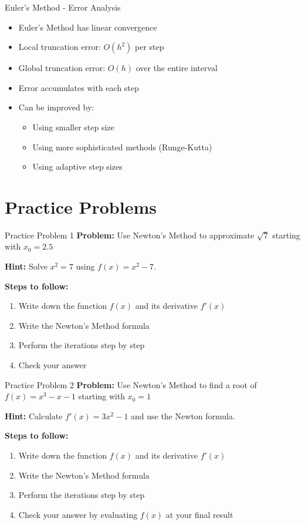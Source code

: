 \documentclass[aspectratio=169]{beamer}
\begin{document}
\begin{frame}{Euler's Method - Error Analysis}
\begin{itemize}
    \item Euler's Method has linear convergence
    \item Local truncation error: $O(h^2)$ per step
    \item Global truncation error: $O(h)$ over the entire interval
    \item Error accumulates with each step
    \item Can be improved by:
    \begin{itemize}
        \item Using smaller step size
        \item Using more sophisticated methods (Runge-Kutta)
        \item Using adaptive step sizes
    \end{itemize}
\end{itemize}
\end{frame}

\section{Practice Problems}

\begin{frame}{Practice Problem 1}
\textbf{Problem:} Use Newton's Method to approximate $\sqrt{7}$ starting with $x_0 = 2.5$

\textbf{Hint:} Solve $x^2 = 7$ using $f(x) = x^2 - 7$.

\vspace{1cm}
\textbf{Steps to follow:}
\begin{enumerate}
    \item Write down the function $f(x)$ and its derivative $f'(x)$
    \item Write the Newton's Method formula
    \item Perform the iterations step by step
    \item Check your answer
\end{enumerate}
\end{frame}

\begin{frame}{Practice Problem 2}
\textbf{Problem:} Use Newton's Method to find a root of $f(x) = x^3 - x - 1$ starting with $x_0 = 1$

\textbf{Hint:} Calculate $f'(x) = 3x^2 - 1$ and use the Newton formula.

\vspace{1cm}
\textbf{Steps to follow:}
\begin{enumerate}
    \item Write down the function $f(x)$ and its derivative $f'(x)$
    \item Write the Newton's Method formula
    \item Perform the iterations step by step
    \item Check your answer by evaluating $f(x)$ at your final result
\end{enumerate}
\end{frame}
\end{document}
